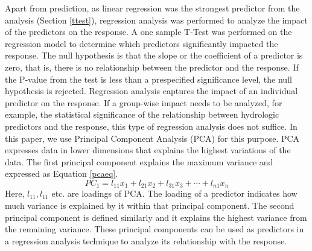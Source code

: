 \documentclass[preprint,review,12pt]{elsarticle}
\begin{document}
Apart from prediction, as linear regression was the strongest predictor from the analysis (Section \ref{ttest}), regression analysis was performed to analyze the impact of the predictors on the response. A one sample T-Test was performed on the regression model to determine which predictors significantly impacted the response. The null hypothesis is that the slope or the coefficient of a predictor is zero, that is, there is no relationship between the predictor and the response.  If the P-value from the test is less than a prespecified significance level, the null hypothesis is rejected. Regression analysis captures the impact of an individual predictor on the response. If a group-wise impact needs to be analyzed, for example, the statistical significance of the relationship between hydrologic predictors and the response, this type of regression analysis does not suffice. In this paper, we use Principal Component Analysis (PCA) for this purpose. PCA expresses data in lower dimensions that explains the highest variations of the data. The first principal component explains the maximum variance and expressed as Equation \ref{pcaeq}.
\begin{equation}
\label{pcaeq}
PC_{1}=l_{11}x_{1}+l_{21}x_{2}+l_{31}x_{3}+\cdots+l_{n1}x_{n}
\end{equation}
Here, $l_{11},l_{11}$ etc. are loadings of PCA. The loading of a predictor indicates how much variance is explained by it within that principal component. The second principal component is defined similarly and it explains the highest variance from the remaining variance. These principal components can be used as predictors in a regression analysis technique to analyze its relationship with the response.

\end{document}
